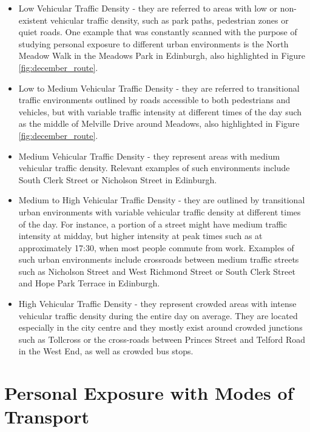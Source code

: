 \documentclass[bsc,frontabs,twoside,singlespacing, parskip,deptreport]{infthesis}     %
\begin{document}
\begin{itemize}
\item Low Vehicular Traffic Density - they are referred to areas with low or non-existent vehicular traffic density, such as park paths, pedestrian zones or quiet roads. One example that was constantly scanned with the purpose of studying personal exposure to different urban environments is the North Meadow Walk in the Meadows Park in Edinburgh, also highlighted in Figure \ref{fig:december_route}.

\item Low to Medium Vehicular Traffic Density - they are referred to transitional traffic environments outlined by roads accessible to both pedestrians and vehicles, but with variable traffic intensity at different times of the day such as the middle of Melville Drive around Meadows, also highlighted in Figure \ref{fig:december_route}.

\item Medium Vehicular Traffic Density - they represent areas with medium vehicular traffic density. Relevant examples of such environments include South Clerk Street or Nicholson Street in Edinburgh.

\item Medium to High Vehicular Traffic Density - they are outlined by transitional urban environments with variable vehicular traffic density at different times of the day. For instance, a portion of a street might have medium traffic intensity at midday, but higher intensity at peak times such as at approximately 17:30, when most people commute from work. Examples of such urban environments include crossroads between medium traffic streets such as Nicholson Street and West Richmond Street or South Clerk Street and Hope Park Terrace in Edinburgh. 

\item High Vehicular Traffic Density - they represent crowded areas with intense vehicular traffic density during the entire day on average. They are located especially in the city centre and they mostly exist around crowded junctions such as Tollcross or the cross-roads between Princes Street and Telford Road in the West End, as well as crowded bus stops.
\end{itemize}
\label{list:urban-environments}

\section{Personal Exposure with Modes of Transport}
\end{document}
